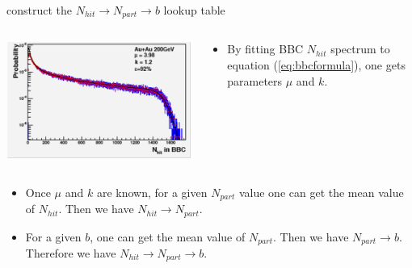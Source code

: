 \documentclass{beamer}
\begin{document}
\begin{frame}{construct the $N_{hit}\rightarrow N_{part}\rightarrow b$ lookup table}
  \begin{columns}
    \begin{column}{.5\textwidth}
      \includegraphics[width=\textwidth]{plots/Nhit_BBC.png}
    \end{column}
    \begin{column}{.5\textwidth}
      \begin{itemize}
        \item By fitting BBC $N_{hit}$ spectrum to equation (\ref{eq:bbcformula}), one gets parameters $\mu$ and $k$.
      \end{itemize}
    \end{column}
  \end{columns}
  \begin{itemize}
      \item Once $\mu$ and $k$ are known, for a given $N_{part}$ value one can get the mean value of $N_{hit}$. Then we have $N_{hit}\rightarrow N_{part}$.
      \item For a given $b$, one can get the mean value of $N_{part}$. Then we have $N_{part}\rightarrow b$. Therefore we have $N_{hit}\rightarrow N_{part}\rightarrow b$.
    \end{itemize}
\end{frame}
\end{document}
